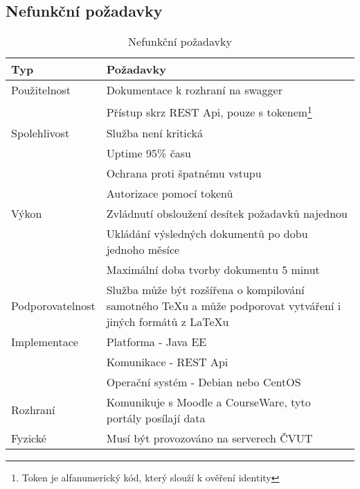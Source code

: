  \subsection{Nefunkční požadavky}
 
 \begin{table}[H]
 	\begin{center}
 		\begin{tabular}{ p{4cm} P{8,6cm} }
 			\textbf{Typ} & \textbf{Požadavky} \\
 			\midrule[0,15em]
 			Použitelnost & \tabitem Dokumentace k rozhraní na swagger \footnotemark \\
 						& \tabitem Přístup skrz REST Api, pouze s tokenem\footnote{Token je alfanumerický kód, který slouží k ověření identity}\\
 			\midrule		
 			Spolehlivost & \tabitem Služba není kritická\\
 						& \tabitem Uptime 95\% času\\ 
 						& \tabitem Ochrana proti špatnému vstupu\\
 						& \tabitem Autorizace pomocí tokenů\\
 			\midrule
 			Výkon & \tabitem Zvládnutí obsloužení desítek požadavků najednou\\
 						& \tabitem Ukládání výsledných dokumentů po dobu jednoho měsíce\\
 						& \tabitem Maximální doba tvorby dokumentu 5 minut\\	
			\midrule
			Podporovatelnost & \tabitem Služba může být rozšířena o kompilování samotného TeXu a může podporovat vytváření i jiných formátů z \LaTeX u\\	
			\midrule
			Implementace & \tabitem Platforma - Java EE\\
						& \tabitem Komunikace - REST Api\\
						& \tabitem Operační systém - Debian nebo CentOS\\
			\midrule
 			Rozhraní & \tabitem Komunikuje s Moodle a CourseWare, tyto portály posílají data\\
 			\midrule
 			Fyzické & \tabitem Musí být provozováno na serverech ČVUT\\
 	\end{tabular}
 	\end{center}
 	\caption{Nefunkční požadavky}
 	\label{tab:errors}
 \end{table}
 
